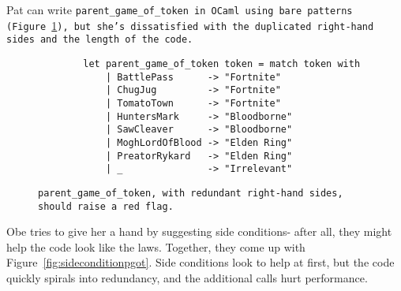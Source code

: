 \documentclass[manuscript,screen,review, 12pt]{acmart}
\begin{document}
        
        
        Pat can write \tt{parent\_game\_of\_token} in OCaml using bare patterns
        (Figure~\ref{fig:barepgot}), but she's dissatisfied with the duplicated
        right-hand sides and the length of the code. 
        
        
        \begin{figure}
            \begin{center}
                \begin{verbatim}
        let parent_game_of_token token = match token with 
            | BattlePass      -> "Fortnite"
            | ChugJug         -> "Fortnite"
            | TomatoTown      -> "Fortnite"
            | HuntersMark     -> "Bloodborne"
            | SawCleaver      -> "Bloodborne"
            | MoghLordOfBlood -> "Elden Ring"
            | PreatorRykard   -> "Elden Ring"
            | _               -> "Irrelevant"
                \end{verbatim}
            \end{center}    

        \caption{\tt{parent\_game\_of\_token}, with redundant right-hand sides,
        should raise a red flag.} 
        \label{fig:barepgot}
        \end{figure}

        Obe tries to give her a hand by suggesting side conditions- after all,
        they might help the code look like the laws. Together, they come up with
        Figure~\ref{fig:sideconditionpgot}. Side conditions look to help at
        first, but the code quickly spirals into redundancy, and the additional
        calls hurt performance. 
\end{document}

